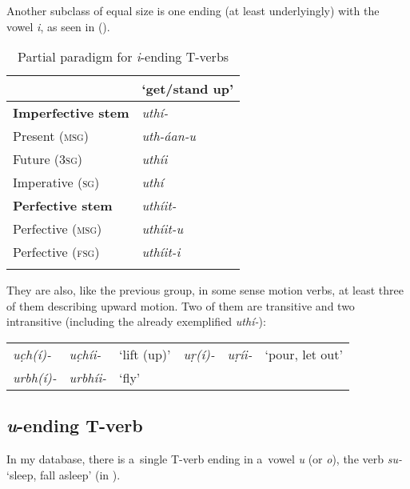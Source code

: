 Another subclass of equal size is one ending (at least underlyingly) with the vowel \textit{i}, as seen in ().


\begin{table}[ht]
\caption{Partial paradigm for \textit{i}-ending T-verbs}
\begin{tabularx}{.75\textwidth}{ Q Q }
\lsptoprule
&
\textbf{`get/stand up'}\\\hline
\textbf{Imperfective stem} &
\textit{uthí-} \\
Present (\textsc{msg}) &
\textit{uth-áan-u} \\
Future (\textsc{3sg}) &
\textit{uthíi} \\
Imperative (\textsc{sg}) &
\textit{uthí} \\
\textbf{Perfective stem} &
\textit{uthíit-} \\
Perfective (\textsc{msg}) &
\textit{uthíit-u} \\
Perfective (\textsc{fsg}) &
\textit{uthíit-i} \\\lspbottomrule
\end{tabularx}
\label{tab:8-11}
\end{table}


They are also, like the previous group, in some sense motion verbs, at least three of them describing upward motion. Two of them are transitive and two intransitive (including the already exemplified \textit{uthí-}):


\begin{table}[H]
\begin{tabularx}{\textwidth}{ Q Q Q Q Q l@{\hspace{20pt}} }

\textit{uc̣h(í)-} &
\textit{uc̣híi-} &
`lift (up)' &
\textit{uṛ(í)-} &
\textit{uṛíi-} &
`pour, let out'\\
\textit{urbh(í)-} &
\textit{urbhíi-} &
`fly' &
&
&
\\
\end{tabularx}
\end{table}

\subsection{\textit{u}-ending T-verb}
\label{subsec:8-3-10}


In my database, there is a~single T-verb ending in a~vowel \textit{u} (or \textit{o}), the verb \textit{su-} `sleep, fall asleep' (in ).


